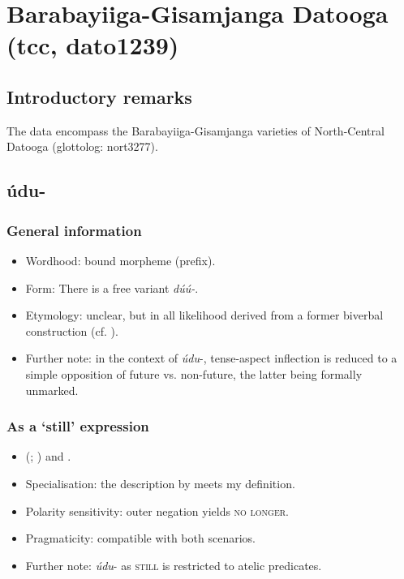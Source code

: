 \section{Barabayiiga-Gisamjanga Datooga (tcc, dato1239)}
\label{appendixDatooga}
\subsection{Introductory remarks}
The data encompass the Barabayiiga-Gisamjanga varieties of North-Central Datooga (glottolog: nort3277).

\subsection{údu-}
\subsubsection{General information}
\begin{itemize}
	\item Wordhood: bound morpheme (prefix).
	\item Form: There is a free variant \textit{dúú-}.
	\item Etymology: unclear, but in all likelihood derived from a former biverbal construction (cf. \cite[428]{Mitchell2021}).
	\item Further note: in the context of \mbox{\textit{údu}-}, tense-aspect inflection is reduced to a simple opposition of future vs. non-future, the latter being formally unmarked.
\end{itemize}


\subsubsection{As a  \lq still\rq{ }expression}
\begin{itemize}
\item \citeauthor{Rottland1982} (\citeyear[174, 179]{Rottland1982}; \citeyear[226]{Rottland1983}) and \textcite{Mitchell2021}.
\item Specialisation: the description by \textcite[426]{Mitchell2021} meets my definition.
\item Polarity sensitivity: outer negation yields \textsc{no longer}.
\item Pragmaticity: compatible with both scenarios.
\item Further note: \mbox{\textit{údu}-} as \textsc{still} is restricted to atelic predicates.
\end{itemize}

